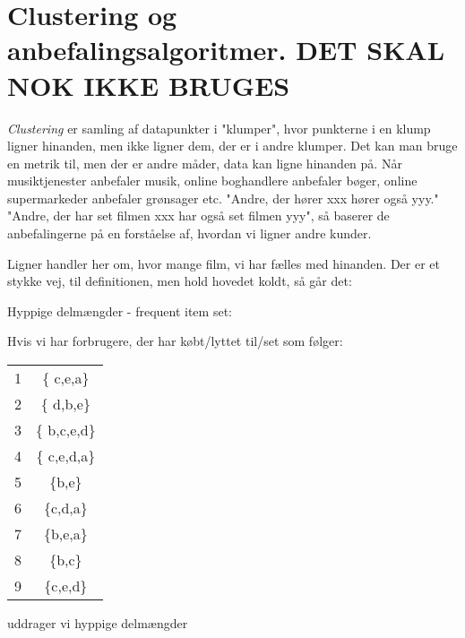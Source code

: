 \documentclass[a4paper, 12pt]{article}
\theoremstyle{remark}
\begin{document}
\section*{Clustering og anbefalingsalgoritmer. DET SKAL NOK IKKE BRUGES}

\emph{Clustering} er samling af datapunkter i "klumper", hvor punkterne i en klump ligner hinanden, men ikke ligner dem, der er i andre klumper. Det kan man bruge en metrik til, men der er andre måder, data kan ligne hinanden på. Når musiktjenester anbefaler musik, online boghandlere anbefaler bøger, online supermarkeder anbefaler grønsager etc. "Andre, der hører xxx hører også yyy." "Andre, der har set filmen xxx har også set filmen yyy", så baserer de anbefalingerne på en forståelse af, hvordan vi ligner andre kunder. 

Ligner handler her om, hvor mange film, vi har fælles med hinanden. Der er et stykke vej, til definitionen, men hold hovedet koldt, så går det:

Hyppige delmængder - frequent item set:

Hvis vi har forbrugere, der har købt/lyttet til/set som følger:
\begin{center}
\begin{tabular}{cc}
1 & \{ c,e,a\} \\
2 & \{ d,b,e\} \\
3 & \{ b,c,e,d\} \\
4& \{ c,e,d,a\} \\
5& \{b,e\} \\
6& \{c,d,a\} \\
7&\{b,e,a\} \\
8& \{b,c\} \\
9& \{c,e,d\} 

\end{tabular}
\end{center}
uddrager vi hyppige delmængder
\end{document}
